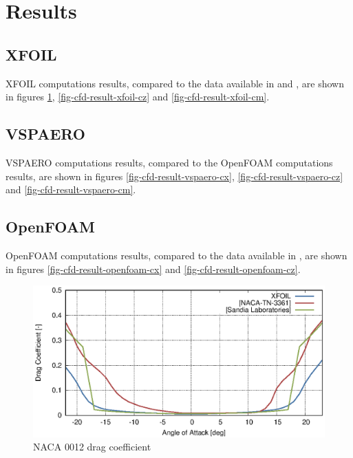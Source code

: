 \section{Results}

\subsection{XFOIL}

XFOIL computations results, compared to the data available in \cite{NACA-TN-3361} and \cite{SheldahiKlimas1981}, are shown in figures \ref{fig-cfd-result-xfoil-cx}, \ref{fig-cfd-result-xfoil-cz} and \ref{fig-cfd-result-xfoil-cm}.

\subsection{VSPAERO}

VSPAERO computations results, compared to the OpenFOAM computations results, are shown in figures \ref{fig-cfd-result-vspaero-cx}, \ref{fig-cfd-result-vspaero-cz} and \ref{fig-cfd-result-vspaero-cm}.

\subsection{OpenFOAM}

OpenFOAM computations results, compared to the data available in \cite{NASA-TP-1538}, are shown in figures \ref{fig-cfd-result-openfoam-cx} and \ref{fig-cfd-result-openfoam-cz}.

\clearpage

\begin{figure}
  \centering
  \includegraphics[width=140mm]{eps/xfoil_naca0012_cx.eps}
  \caption{NACA 0012 drag coefficient}
  \label{fig-cfd-result-xfoil-cx}
\end{figure}


